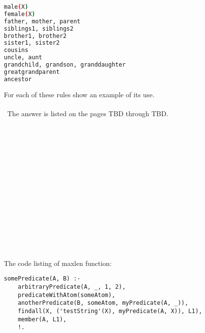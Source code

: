 \documentclass{article}
\begin{document}
	\begin{lstlisting}[language=bash]
male(X)
female(X)
father, mother, parent
siblings1, siblings2
brother1, brother2
sister1, sister2
cousins
uncle, aunt
grandchild, grandson, granddaughter
greatgrandparent
ancestor
	\end{lstlisting}
	
	For each of these rules show an example of its use.
\paragraph{}\
	The answer is listed on the pages TBD through TBD.

\paragraph{}\
\paragraph{}\
\paragraph{}\
\paragraph{}\
\paragraph{}\
\paragraph{}\
\paragraph{}\



\noindent The code listing of maxlen function:
\ttfamily
	
\begin{verbatim} 
somePredicate(A, B) :-
    arbitraryPredicate(A, _, 1, 2),
    predicateWithAtom(someAtom),
    anotherPredicate(B, someAtom, myPredicate(A, _)),
    findall(X, ('testString'(X), myPredicate(A, X)), L1),
    member(A, L1),
    !.
\end{verbatim}
	

\paragraph{}\
\end{document}
